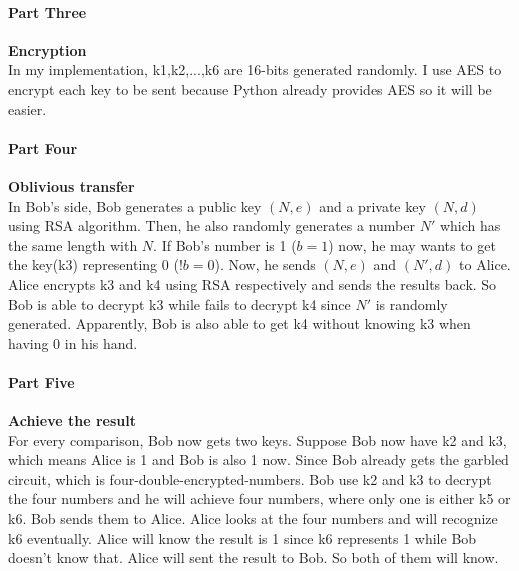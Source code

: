 \documentclass[11pt]{article}
\begin{document}
\paragraph{Part Three}{\textbf{Encryption}}\vspace{2ex}\\
In my implementation, k1,k2,...,k6 are 16-bits generated randomly. I use AES to encrypt each key to be sent because Python already provides AES so it will be easier.
\paragraph{Part Four}{\textbf{Oblivious transfer}}\vspace{2ex}\\
In Bob's side, Bob generates a public key $(N,e)$ and a private key $(N,d)$ using RSA algorithm. Then, he also randomly generates a number $N'$ which has the same length with $N$. If Bob's number is 1 ($b = 1$) now, he may wants to get the key(k3) representing 0 ($!b = 0$). Now, he sends $(N,e)$ and $(N',d)$ to Alice. Alice encrypts k3 and k4 using RSA respectively and sends the results back. So Bob is able to decrypt k3 while fails to decrypt k4 since $N'$ is randomly generated. Apparently, Bob is also able to get k4 without knowing k3 when having 0 in his hand.
\paragraph{Part Five}{\textbf{Achieve the result}}\vspace{2ex}\\
For every comparison, Bob now gets two keys. Suppose Bob now have k2 and k3, which means Alice is 1 and Bob is also 1 now. Since Bob already gets the garbled circuit, which is four-double-encrypted-numbers. Bob use k2 and k3 to decrypt the four numbers and he will achieve four numbers, where only one is either k5 or k6. Bob sends them to Alice. Alice looks at the four numbers and will recognize k6 eventually. Alice will know the result is 1 since k6 represents 1 while Bob doesn't know that. Alice will sent the result to Bob. So both of them will know.
\end{document}
